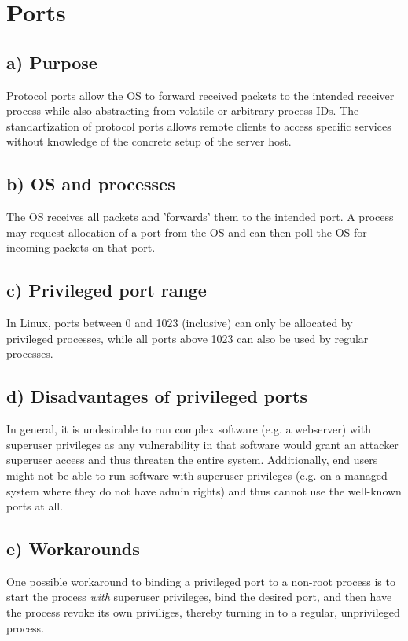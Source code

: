 \documentclass[a4paper, 11 pt, article, accentcolor=tud7b]{tudreport}
\begin{document}
	\section{Ports}
	
	\subsection*{a) Purpose}
	Protocol ports allow the OS to forward received packets to the intended receiver process while also abstracting from volatile or arbitrary process IDs. The standartization of protocol ports allows remote clients to access specific services without knowledge of the concrete setup of the server host.
	
	\subsection*{b) OS and processes}
	The OS receives all packets and 'forwards' them to the intended port. A process may request allocation of a port from the OS and can then poll the OS for incoming packets on that port.
	
	\subsection*{c) Privileged port range}
	In Linux, ports between 0 and 1023 (inclusive) can only be allocated by privileged processes, while all ports above 1023 can also be used by regular processes.
	
	\subsection*{d) Disadvantages of privileged ports}
	In general, it is undesirable to run complex software (e.g. a webserver) with superuser privileges as any vulnerability in that software would grant an attacker superuser access and thus threaten the entire system. Additionally, end users might not be able to run software with superuser privileges (e.g. on a managed system where they do not have admin rights) and thus cannot use the well-known ports at all.
	
	\subsection*{e) Workarounds}
	One possible workaround to binding a privileged port to a non-root process is to start the process \textit{with} superuser privileges, bind the desired port, and then have the process revoke its own priviliges, thereby turning in to a regular, unprivileged process.
	
\end{document}

